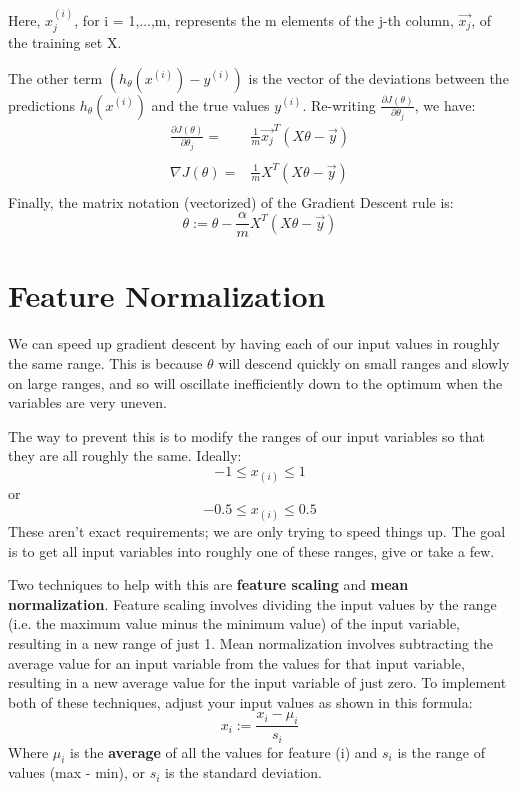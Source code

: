 Here, $x_j^{(i)} $, for i = 1,...,m, represents the m elements of the j-th column, $\vec{x_j}$, of the training set X.

The other term $\left(h_\theta(x^{(i)}) - y^{(i)} \right)$ is the vector of the deviations between the predictions $h_\theta(x^{(i)})$ and the true values $y^{(i)}$. Re-writing $\frac{\partial J(\theta)}{\partial \theta_j}$, we have:
\begin{align*}
\frac{\partial J(\theta)}{\partial \theta_j} =& \frac1m  \vec{x_j}^{T} (X\theta - \vec{y}) \\ \\
\nabla J(\theta)  =& \frac 1m X^{T} (X\theta - \vec{y}) \\
\end{align*}
Finally, the matrix notation (vectorized) of the Gradient Descent rule is:
\begin{equation}
\theta := \theta - \frac{\alpha}{m}X^T (X\theta - \vec{y})
\end{equation}
\section*{Feature Normalization}
We can speed up gradient descent by having each of our input values in roughly the same range. This is because $\theta$ will descend quickly on small ranges and slowly on large ranges, and so will oscillate inefficiently down to the optimum when the variables are very uneven.

The way to prevent this is to modify the ranges of our input variables so that they are all roughly the same. Ideally:
$$-1 \leq x_{(i)} \leq 1 $$
or
$$-0.5 \leq x_{(i)}\leq 0.5 $$
These aren't exact requirements; we are only trying to speed things up. The goal is to get all input variables into roughly one of these ranges, give or take a few.

Two techniques to help with this are {\bf feature scaling} and {\bf mean normalization}. Feature scaling involves dividing the input values by the range (i.e. the maximum value minus the minimum value) of the input variable, resulting in a new range of just 1. Mean normalization involves subtracting the average value for an input variable from the values for that input variable, resulting in a new average value for the input variable of just zero. To implement both of these techniques, adjust your input values as shown in this formula:
\begin{equation}
x_i := \frac{x_i-\mu_i}{s_i}
\end{equation}
Where $\mu_i$ is the {\bf average} of all the values for feature (i) and $s_i$ is the range of values (max - min), or $s_i$ is the standard deviation.

